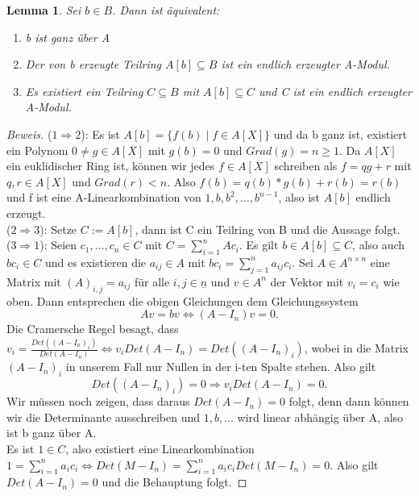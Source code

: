 \documentclass{article}
\newtheorem{lemma}[satz]{Lemma}
\begin{document}
	\begin{lemma}
	Sei \(b \in B\). Dann ist äquivalent:
	\begin{enumerate}
	\item b ist ganz über A
	\item Der von b erzeugte Teilring \(A[b] \subseteq B\) ist ein endlich
	erzeugter A-Modul.
	\item Es existiert ein Teilring \(C \subseteq B\) mit \(A[b] \subseteq C\)
	und C ist ein endlich erzeugter A-Modul.
	\end{enumerate}
	\end{lemma}

	\begin{proof}[Beweis]
	(\(1 \Rightarrow 2\)): Es ist \(A[b] = \{f(b)\;|\;f\in A[X]\}\)
	und da b ganz ist, existiert ein Polynom \(0 \neq g \in A[X]\) mit \(g(b) 
	= 0\) und \(Grad(g) = n \geq 1\). Da \(A[X]\) ein euklidischer Ring ist, können
	wir jedes \(f \in A[X]\) schreiben als \(f = qg + r\) mit \(q,r \in A[X]\)
	und \(Grad(r) < n\). Also \(f(b) = q(b)*g(b) + r(b) = r(b)\) und f ist eine
	A-Linearkombination von \(1, b, b^2, \ldots, b^{n-1}\), also ist \(A[b]\)
	endlich erzeugt. \\
	(\(2 \Rightarrow 3\)): Setze \(C := A[b]\), dann ist C ein Teilring von B
	und die Aussage folgt. \\
	(\(3 \Rightarrow 1\)): Seien \(c_1, \ldots, c_n \in C\) mit \(C =
	\sum_{i=1}^n Ac_i\). Es gilt \(b \in A[b] \subseteq C\), also auch \(bc_i
	\in C\) und es existieren die \(a_{ij} \in A\) mit \(bc_i = \sum_{j=1}^n
	a_{ij}c_i\). Sei \(A \in A^{n\times n}\) eine Matrix mit \((A)_{i,j} =
	a_{ij}\) für alle \(i, j \in \underline{n}\) und \(v \in A^n\) der Vektor
	mit \(v_i = c_i\) wie oben. Dann entsprechen die obigen Gleichungen dem
	Gleichungssystem
	\begin{displaymath}Av = bv \Leftrightarrow (A-I_n)v = 0.\end{displaymath}
	Die Cramersche Regel besagt, dass \(v_i = \frac{Det((A-I_n)_i)}{Det(A-I_n)}
	\Leftrightarrow v_iDet(A-I_n) = Det((A-I_n)_i)\), wobei in die Matrix
	\((A-I_n)_i \) in unserem Fall nur Nullen in der i-ten Spalte stehen. Also
	gilt \begin{displaymath} Det((A-I_n)_i) = 0 \Rightarrow v_iDet(A-I_n) = 0.
	\end{displaymath}
	Wir müssen noch zeigen, dass daraus \(Det(A-I_n) = 0\) folgt, denn dann 
	können wir die Determinante ausschreiben und \(1, b, \ldots\) wird linear
	abhängig über A, also ist b ganz über A. \\
	Es ist \(1 \in C\), also existiert eine Linearkombination \(1 =
	\sum_{i=1}^n a_ic_i \Leftrightarrow Det(M-I_n) = \sum_{i=1}^n
	a_ic_iDet(M-I_n) = 0\). Also gilt \(Det(A-I_n) = 0\) und die
	Behauptung folgt.
	\end{proof}
\end{document}
